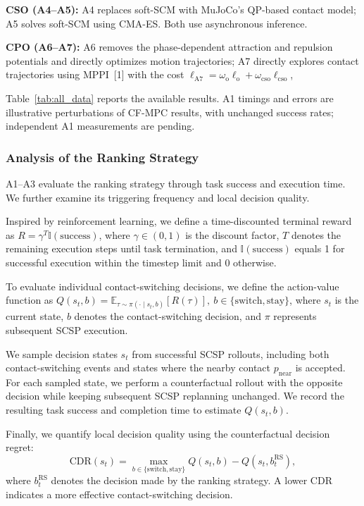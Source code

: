\textbf{CSO (A4--A5):} A4 replaces soft-SCM with MuJoCo's QP-based contact model; A5 solves soft-SCM using CMA-ES. Both use asynchronous inference.

\textbf{CPO (A6--A7):} A6 removes the phase-dependent attraction and repulsion potentials and directly optimizes motion trajectories; A7 directly explores contact trajectories using MPPI~[1] with the cost $\ell_{\mathrm{A7}} = \omega_{\text{o}}\ell_{\text{o}} + \omega_{\text{cso}}\ell_{\text{cso}}$,

Table~\ref{tab:all_data} reports the available results. A1 timings and errors are illustrative perturbations of CF-MPC results, with unchanged success rates; independent A1 measurements are pending.

\subsubsection{Analysis of the Ranking Strategy}
\label{sec:ranking_ablation}
A1--A3 evaluate the ranking strategy through task success and execution time. We further examine its triggering frequency and local decision quality.

Inspired by reinforcement learning, we define a time-discounted terminal reward as $
R=\gamma^{T}\mathbb{I}(\mathrm{success})$,
where $\gamma\in(0,1)$ is the discount factor, $T$ denotes the remaining execution steps until task termination, and $\mathbb{I}(\mathrm{success})$ equals 1 for successful execution within the timestep limit and 0 otherwise.

To evaluate individual contact-switching decisions, we define the action-value function as $
Q(s_t,b)=\mathbb{E}_{\tau\sim\pi(\cdot\mid s_t,b)}[R(\tau)], \ b\in\{\mathrm{switch},\mathrm{stay}\}$, 
where $s_t$ is the current state, $b$ denotes the contact-switching decision, and $\pi$ represents subsequent SCSP execution.

We sample decision states $s_t$ from successful SCSP rollouts, including both contact-switching events and states where the nearby contact $p_{\mathrm{near}}$ is accepted. For each sampled state, we perform a counterfactual rollout with the opposite decision while keeping subsequent SCSP replanning unchanged. We record the resulting task success and completion time to estimate $Q(s_t,b)$.

Finally, we quantify local decision quality using the counterfactual decision regret:
\begin{equation}
\mathrm{CDR}(s_t)=
\max_{b\in\{\mathrm{switch},\mathrm{stay}\}}Q(s_t,b)
-Q(s_t,b_t^{\mathrm{RS}}),
\end{equation}
where $b_t^{\mathrm{RS}}$ denotes the decision made by the ranking strategy. A lower CDR indicates a more effective contact-switching decision.

